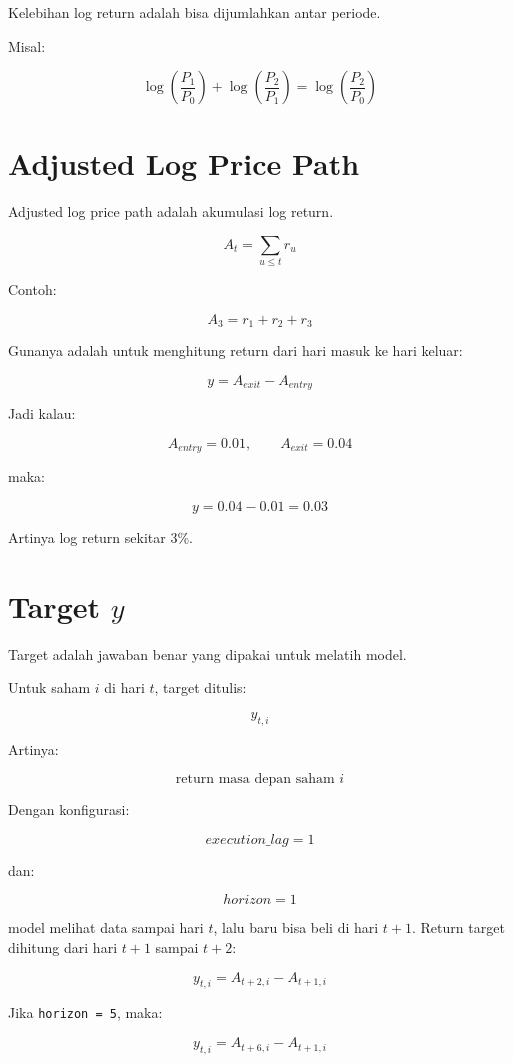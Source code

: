 \documentclass[11pt,a4paper]{article}
\begin{document}
Kelebihan log return adalah bisa dijumlahkan antar periode.

Misal:

\[
\log\left(\frac{P_1}{P_0}\right)
+
\log\left(\frac{P_2}{P_1}\right)
=
\log\left(\frac{P_2}{P_0}\right)
\]

\section{Adjusted Log Price Path}

Adjusted log price path adalah akumulasi log return.

\[
\boxed{
A_t = \sum_{u \leq t} r_u
}
\]

Contoh:

\[
A_3 = r_1 + r_2 + r_3
\]

Gunanya adalah untuk menghitung return dari hari masuk ke hari keluar:

\[
\boxed{
y = A_{exit} - A_{entry}
}
\]

Jadi kalau:

\[
A_{entry}=0.01,
\qquad
A_{exit}=0.04
\]

maka:

\[
y = 0.04 - 0.01 = 0.03
\]

Artinya log return sekitar 3\%.

\section{Target \texorpdfstring{$y$}{y}}

Target adalah jawaban benar yang dipakai untuk melatih model.

Untuk saham \(i\) di hari \(t\), target ditulis:

\[
y_{t,i}
\]

Artinya:

\[
\text{return masa depan saham } i
\]

Dengan konfigurasi:

\[
execution\_lag = 1
\]

dan:

\[
horizon = 1
\]

model melihat data sampai hari \(t\), lalu baru bisa beli di hari \(t+1\).
Return target dihitung dari hari \(t+1\) sampai \(t+2\):

\[
\boxed{
y_{t,i} = A_{t+2,i} - A_{t+1,i}
}
\]

Jika \texttt{horizon = 5}, maka:

\[
\boxed{
y_{t,i} = A_{t+6,i} - A_{t+1,i}
}
\]
\end{document}
